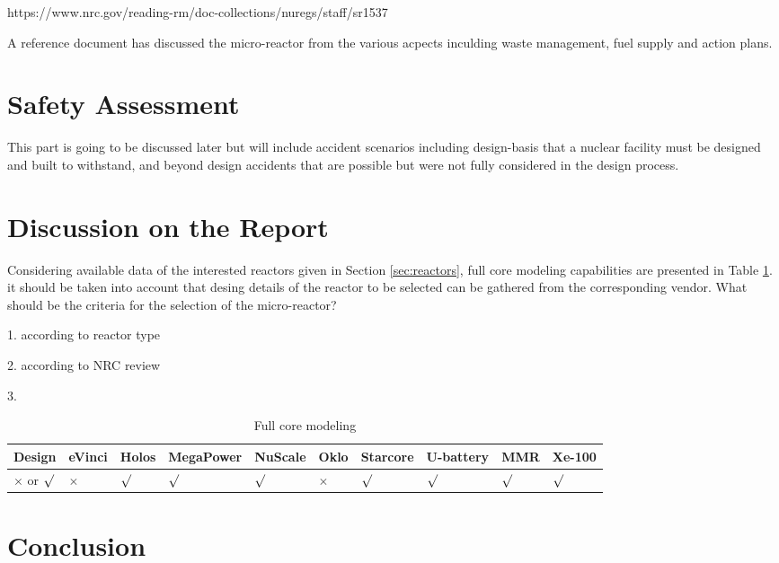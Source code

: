 \documentclass[10pt,a4paper]{article}
\begin{document}
https://www.nrc.gov/reading-rm/doc-collections/nuregs/staff/sr1537

A reference document \cite{nichol_roadmap_2018} has discussed  the micro-reactor from the various acpects inculding waste management, fuel supply and action plans.


\section{Safety Assessment}
This part is going to be discussed later but will include accident scenarios including design-basis that a nuclear facility must be designed and built to withstand, and beyond design accidents that are possible but were not fully considered in the design process.

\section{Discussion on the Report}

Considering available data of the interested reactors given in Section \ref{sec:reactors}, full core modeling capabilities are presented in Table \ref{table:feasiblity}. it should be taken into account that desing details of the reactor to be selected can be gathered from the corresponding vendor. What should be the criteria for the selection of the micro-reactor?

1. according to reactor type

2. according to NRC review

3. 

\begin{table} [ht]
\begin{center}

\caption{Full core modeling}
\label{table:feasiblity}
\begin{tabular}{|l|l|l|l|l|l|l|l|l|l|}
\hline 
Design 		&eVinci 		& Holos		&MegaPower 	& NuScale		& Oklo 		& Starcore		& U-battery 	 & MMR	& Xe-100 \\ 
\hline 
$\times$ or 	$\surd$ 		&  $\times$		& $\surd$		& $\surd$ 	&   $\surd$		&  $\times$		& $\surd$	&  $\surd$ 	&  $\surd$	&  $\surd$ \\ 
\hline 

\end{tabular}
\end{center}
\end{table}

\pagebreak
\section{Conclusion}

\pagebreak


\end{document}
